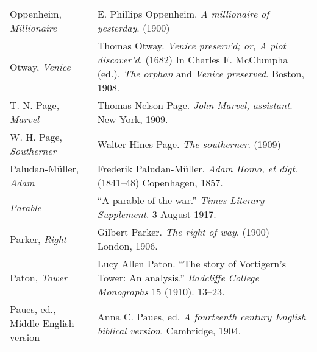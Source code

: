 \begin{longtable}{p{} p{}}
Oppenheim, \textit{Millionaire} & E. Phillips Oppenheim. \textit{A millionaire of yesterday}. (1900) \\

Otway, \textit{Venice} & Thomas Otway. \textit{Venice preserv’d; or, A plot discover’d}. (1682) In Charles F. McClumpha (ed.), \textit{The orphan} and \textit{Venice preserved}. Boston, 1908. \\ %

T. N. Page, \textit{Marvel} & Thomas Nelson Page. \textit{John Marvel, assistant}. New York, 1909. \\

W. H. Page, \textit{Southerner} & Walter Hines Page. \textit{The southerner}. (1909) \\

Paludan-Müller, \textit{Adam} & Frederik Paludan-Müller. \textit{Adam Homo, et digt}. (1841--48) Copenhagen, 1857. \\

\textit{Parable} & ``A parable of the war.'' \textit{Times Literary Supplement}. 3 August 1917. \\ %
%

Parker, \textit{Right} & Gilbert Parker. \textit{The right of way}. (1900) London, 1906. \\

Paton, \textit{Tower} & Lucy Allen Paton. ``The story of Vortigern's Tower: An analysis.'' \textit{Radcliffe College Monographs} 15 (1910). 13--23. \\

\raggedright {Paues, ed., Middle English version} & Anna C. Paues, ed. \textit{A fourteenth century English biblical version}. Cambridge, 1904. \\ %
%


\end{longtable}
